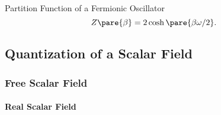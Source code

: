 \documentclass[hidelinks]{article}
\begin{document}

\begin{finaleq}{Partition Function of a Fermionic Oscillator}
    \[ Z\pare{\beta} = 2\cosh\pare{\beta\omega/2}. \]
\end{finaleq}



\subsection{Quantization of a Scalar Field} %
\label{sub:quantization_of_a_scalar_field}

\subsubsection{Free Scalar Field} %
\label{ssub:free_scalar_field}

\paragraph{Real Scalar Field} %
\label{par:real_scalar_field}
\end{document}
